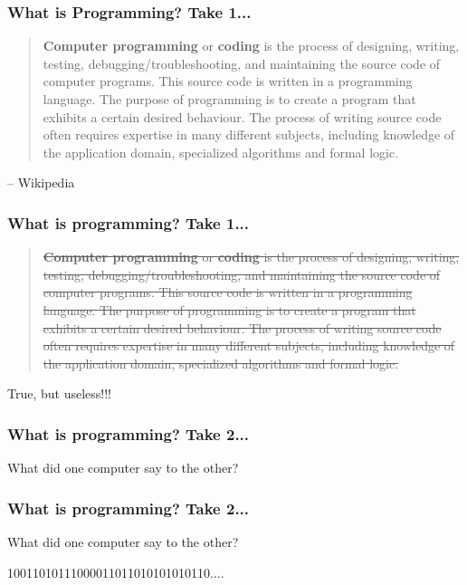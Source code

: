 \documentclass[10pt]{beamer}
\begin{document}
\begin{frame}
  \frametitle{What is Programming? Take 1...}
  \begin{quote}
    \textbf{Computer programming} or \textbf{coding} is the process of designing, writing, testing, debugging/troubleshooting, and maintaining the source code of computer programs. 
    This source code is written in a programming language. The purpose of programming is to create a program that exhibits a certain desired behaviour. 
    The process of writing source code often requires expertise in many different subjects, including knowledge of the application domain, specialized algorithms and formal logic.
  \end{quote}
  \begin{flushright}
    \footnotesize -- Wikipedia
  \end{flushright}
\end{frame}

\begin{frame}
  \frametitle{What is programming? Take 1...}
  \begin{quote}
    \footnotesize
    \sout{
      \textbf{Computer programming} or \textbf{coding} is the process of designing, writing, testing, debugging/troubleshooting, and maintaining the source code of computer programs. 
      This source code is written in a programming language. The purpose of programming is to create a program that exhibits a certain desired behaviour. 
      The process of writing source code often requires expertise in many different subjects, including knowledge of the application domain, specialized algorithms and formal logic.
    }
  \end{quote}
  \normalsize
  \begin{center} True, but useless!!! \end{center}
\end{frame}

\begin{frame}
  \frametitle{What is programming? Take 2...}
  \begin{center} What did one computer say to the other? \end{center}
\end{frame}

\begin{frame}
  \frametitle{What is programming? Take 2...}
  \begin{center} What did one computer say to the other? \end{center}
  \begin{center} 10011010111000011011010101010110.... \end{center}
\end{frame}
\end{document}
